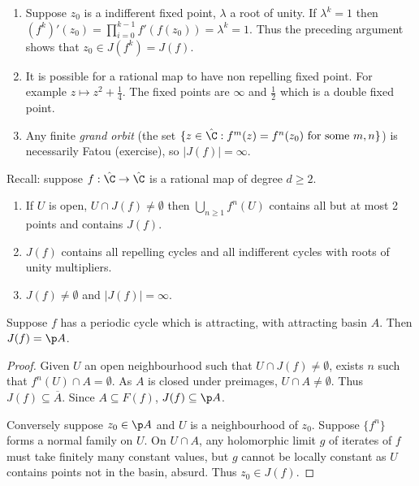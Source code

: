 \documentclass[a4paper]{article}
\begin{document}
\begin{remark}\leavevmode
  \begin{enumerate}
  \item Suppose \(z_0\) is a indifferent fixed point, \(\lambda\) a root of unity. If \(\lambda^k = 1\) then \((f^k)'(z_0) = \prod_{i = 0}^{k - 1} f'(f(z_0)) = \lambda^k = 1\). Thus the preceding argument shows that \(z_0 \in J(f^k) = J(f)\).
  \item It is possible for a rational map to have non repelling fixed point. For example \(z \mapsto z^2 + \frac{1}{4}\). The fixed points are \(\infty\) and \(\frac{1}{2}\) which is a double fixed point.
  \item Any finite \emph{grand orbit} (the set \(\{z \in \hat \C: f^m(z) = f^n(z_0) \text{ for some } m, n\}\)) is necessarily Fatou (exercise), so \(|J(f)| = \infty\).
  \end{enumerate}
\end{remark}

Recall: suppose \(f: \hat \C \to \hat \C\) is a rational map of degree \(d \geq 2\).

\begin{enumerate}
\item If \(U\) is open, \(U \cap J(f) \ne \emptyset\) then \(\bigcup_{n \geq 1} f^n(U)\) contains all but at most 2 points and contains \(J(f)\).
\item \(J(f)\) contains all repelling cycles and all indifferent cycles with roots of unity multipliers.
\item \(J(f) \ne \emptyset\) and \(|J(f)| = \infty\).
\end{enumerate}

\begin{proposition}
  Suppose \(f\) has a periodic cycle which is attracting, with attracting basin \(A\). Then \(J(f) = \p A\).
\end{proposition}

\begin{proof}
  Given \(U\) an open neighbourhood such that \(U \cap J(f) \ne \emptyset\), exists \(n\) such that \(f^n(U) \cap A = \emptyset\). As \(A\) is closed under preimages, \(U \cap A \ne \emptyset\). Thus \(J(f) \subseteq \overline A\). Since \(A \subseteq F(f)\), \(J(f) \subseteq \p A\).

  Conversely suppose \(z_0 \in \p A\) and \(U\) is a neighbourhood of \(z_0\). Suppose \(\{f^n\}\) forms a normal family on \(U\). On \(U \cap A\), any holomorphic limit \(g\) of iterates of \(f\) must take finitely many constant values, but \(g\) cannot be locally constant as \(U\) contains points not in the basin, absurd. Thus \(z_0 \in J(f)\).
\end{proof}
\end{document}
